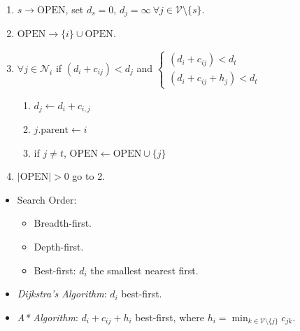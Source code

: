 \documentclass[landscape,a0paper,fontscale=0.285]{baposter} %
\newcommand{\compresslist}{ %
\setlength{\itemsep}{1pt}
\setlength{\parskip}{0pt}
\setlength{\parsep}{0pt}
}
\begin{document}
\begin{poster}
{\begin{minipage}{0.55\textwidth}\compresslist
    \begin{enumerate}
    \item \(s \to \text{OPEN}\), set \(d_s = 0\), \(d_j = \infty \ \forall j \in \mathcal{V} \setminus \{s\}\).
    \item \(\text{OPEN} \rightarrow \{i\} \cup \text{OPEN}\).
    \item  \(\forall j \in \mathcal{N}_i\) if \((d_i + c_{ij}) < d_j\) and \(\begin{cases}(d_i + c_{ij}) < d_{t}\\(d_i+c_{ij}+h_j)<d_t\end{cases}\)
    \begin{enumerate}
        \item \(d_j \gets d_i + c_{i,j}\)
        \item \(j.\text{parent} \gets i\)
        \item if \(j \neq t\), \(\text{OPEN} \gets \text{OPEN} \cup \{j\}\)
    \end{enumerate}
    \item \(|\text{OPEN}| > 0\) go to 2.
\end{enumerate}
\end{minipage}
\hfill
\begin{minipage}{0.425\textwidth}
    \begin{itemize}
  \item Search Order:
    \begin{itemize}[label=$\circ$]
      \item Breadth-first.
      \item Depth-first.
      \item Best-first: \(d_i\) the smallest nearest first.
    \end{itemize}
  \item\textit{Dijkstra's Algorithm}: \(d_i\) best-first.
  \item \textit{A* Algorithm}: \(d_i +c_{ij} +h_i\) best-first, where \(h_i = \min_{k \in \mathcal{V} \setminus \{j\}} c_{jk}\).
\end{itemize}
\end{minipage}



}



\end{poster}
\end{document}
